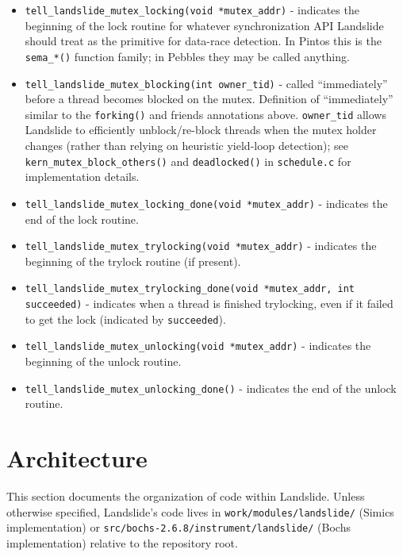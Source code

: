 \begin{itemize}
	\item {\tt tell\_landslide\_mutex\_locking(void *mutex\_addr)} - indicates the beginning of the lock routine for
		whatever synchronization API Landslide should treat as the primitive for data-race detection.
		In Pintos this is the {\tt sema\_*()} function family; in Pebbles they may be called anything.
	\item {\tt tell\_landslide\_mutex\_blocking(int owner\_tid)} - called ``immediately'' before a thread becomes blocked on the mutex.
		Definition of ``immediately'' similar to the {\tt forking()} and friends annotations above.
		{\tt owner\_tid} allows Landslide to efficiently unblock/re-block threads when the mutex holder changes
		(rather than relying on heuristic yield-loop detection);
		see {\tt kern\_mutex\_block\_others()} and {\tt deadlocked()} in {\tt schedule.c} for implementation details.
	\item {\tt tell\_landslide\_mutex\_locking\_done(void *mutex\_addr)} - indicates the end of the lock routine.
	\item {\tt tell\_landslide\_mutex\_trylocking(void *mutex\_addr)} - indicates the beginning of the trylock routine (if present).
	\item {\tt tell\_landslide\_mutex\_trylocking\_done(void *mutex\_addr, int succeeded)} -
		indicates when a thread is finished trylocking, even if it failed to get the lock (indicated by {\tt succeeded}).
	\item {\tt tell\_landslide\_mutex\_unlocking(void *mutex\_addr)} - indicates the beginning of the unlock routine.
	\item {\tt tell\_landslide\_mutex\_unlocking\_done()} - indicates the end of the unlock routine.
\end{itemize}


\section{Architecture}
\label{sec:landslide-architecture}

This section documents the organization of code within Landslide.
Unless otherwise specified, Landslide's code lives in
{\tt work/modules/landslide/} (Simics implementation) or {\tt src/bochs-2.6.8/instrument/landslide/} (Bochs implementation)
relative to the repository root.

